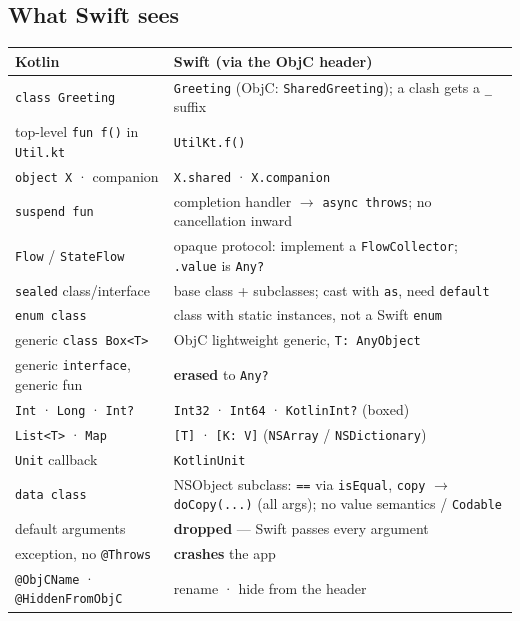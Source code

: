 \documentclass[8pt]{extarticle}
\newcommand\eqeq{\texttt{\hbox{=}\hbox{=}}}  %
\begin{document}
\begin{multicols}{2}
\section{What Swift sees}
{\scriptsize
\noindent\begin{tabularx}{\linewidth}{@{}>{\raggedright\arraybackslash}p{27mm}L@{}}
\toprule
\textbf{Kotlin} & \textbf{Swift (via the ObjC header)} \\
\midrule
\texttt{class Greeting} & \texttt{Greeting} (ObjC: \texttt{SharedGreeting}); a clash
  gets a \texttt{\_} suffix \\
top-level \texttt{fun f()} in \texttt{Util.kt} & \texttt{UtilKt.f()} \\
\texttt{object X} · companion & \texttt{X.shared} · \texttt{X.companion} \\
\texttt{suspend fun} & completion handler $\to$ \texttt{async throws}; no cancellation
  inward \\
\texttt{Flow} / \texttt{StateFlow} & opaque protocol: implement a \texttt{FlowCollector};
  \texttt{.value} is \texttt{Any?} \\
\texttt{sealed} class/interface & base class + subclasses; cast with \texttt{as}, need
  \texttt{default} \\
\texttt{enum class} & class with static instances, not a Swift \texttt{enum} \\
generic \texttt{class Box<T>} & ObjC lightweight generic, \texttt{T: AnyObject} \\
generic \texttt{interface}, generic fun & \textbf{erased} to \texttt{Any?} \\
\texttt{Int} · \texttt{Long} · \texttt{Int?} & \texttt{Int32} · \texttt{Int64} ·
  \texttt{KotlinInt?} (boxed) \\
\texttt{List<T>} · \texttt{Map} & \texttt{[T]} · \texttt{[K: V]} (\texttt{NSArray} /
  \texttt{NSDictionary}) \\
\texttt{Unit} callback & \texttt{KotlinUnit} \\
\texttt{data class} & NSObject subclass: \eqeq{} via \texttt{isEqual},
  \texttt{copy} $\to$ \texttt{doCopy(...)} (all args); no value semantics / \texttt{Codable} \\
default arguments & \textbf{dropped} — Swift passes every argument \\
exception, no \texttt{@Throws} & \textbf{crashes} the app \\
\texttt{@ObjCName} · \texttt{@HiddenFromObjC} & rename · hide from the header \\
\bottomrule
\end{tabularx}}


\end{multicols}
\end{document}

